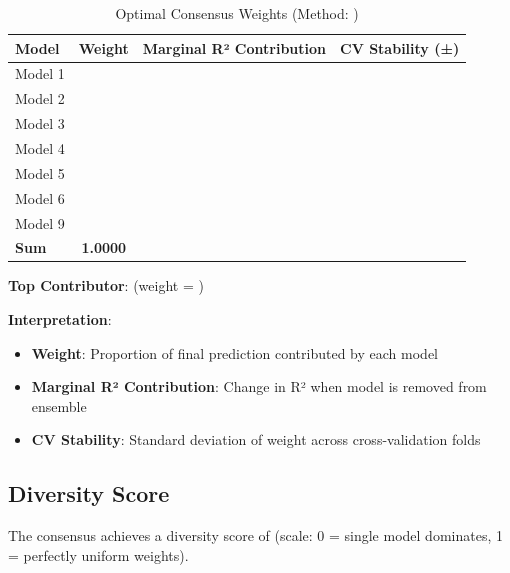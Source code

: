 \begin{table}[h]
\centering
\caption{Optimal Consensus Weights (Method: \ModelElevenMethod{})}
\label{tab:model11_weights}
\begin{tabular}{lccc}
\toprule
\textbf{Model} & \textbf{Weight} & \textbf{Marginal R² Contribution} & \textbf{CV Stability (±)} \\
\midrule
Model 1 & \ModelElevenWeightOne{} & \ModelElevenContribOne{} & \ModelElevenWeightStdOne{} \\
Model 2 & \ModelElevenWeightTwo{} & \ModelElevenContribTwo{} & \ModelElevenWeightStdTwo{} \\
Model 3 & \ModelElevenWeightThree{} & \ModelElevenContribThree{} & \ModelElevenWeightStdThree{} \\
Model 4 & \ModelElevenWeightFour{} & \ModelElevenContribFour{} & \ModelElevenWeightStdFour{} \\
Model 5 & \ModelElevenWeightFive{} & \ModelElevenContribFive{} & \ModelElevenWeightStdFive{} \\
Model 6 & \ModelElevenWeightSix{} & \ModelElevenContribSix{} & \ModelElevenWeightStdSix{} \\
Model 9 & \ModelElevenWeightNine{} & \ModelElevenContribNine{} & \ModelElevenWeightStdNine{} \\
\midrule
\textbf{Sum} & \textbf{1.0000} & & \\
\bottomrule
\end{tabular}
\end{table}

\textbf{Top Contributor}: \ModelElevenTopContributor{} (weight = \ModelElevenTopWeight{})

\textbf{Interpretation}:
\begin{itemize}
    \item \textbf{Weight}: Proportion of final prediction contributed by each model
    \item \textbf{Marginal R² Contribution}: Change in R² when model is removed from ensemble
    \item \textbf{CV Stability}: Standard deviation of weight across cross-validation folds
\end{itemize}

\subsection{Diversity Score}

The consensus achieves a diversity score of \textbf{\ModelElevenDiversityScore{}} (scale: 0 = single model dominates, 1 = perfectly uniform weights).

